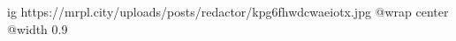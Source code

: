  
 
 
 
 

\ifcmt
  ig https://mrpl.city/uploads/posts/redactor/kpg6fhwdcwaeiotx.jpg
  @wrap center
  @width 0.9
\fi
